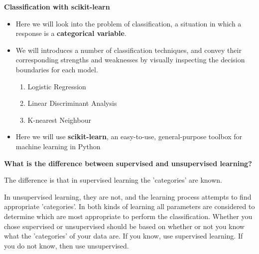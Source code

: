 \documentclass[SKL-MASTER.tex]{subfiles}
\begin{document}
	\LARGE
\noindent \textbf{Classification with scikit-learn}
\begin{itemize}
\item Here we will look into the problem of classification, a situation in which a response is a \textbf{categorical variable}. 
\item We will introduces a number of classification techniques, and 
convey their corresponding strengths and weaknesses by visually inspecting the decision boundaries for each model.
\begin{enumerate}
	\item Logistic Regression
	\item Linear Discriminant Analysis
	\item K-nearest Neighbour
\end{enumerate}
\item Here we will use \textbf{scikit-learn}, an easy-to-use, general-purpose toolbox for machine learning in Python
	\end{itemize}



\textbf{What is the difference between supervised and unsupervised learning?}

The difference is that in supervised learning the 'categories' are known.

In unsupervised learning, they are not, and the learning process attempts to find appropriate 'categories'. In both kinds of learning all parameters are considered to determine which are most appropriate to perform the classification.
Whether you chose supervised or unsupervised should be based on whether or not you know what the
'categories' of your data are. If you know, use supervised learning. If you do not know, then use
unsupervised.
\end{document}
